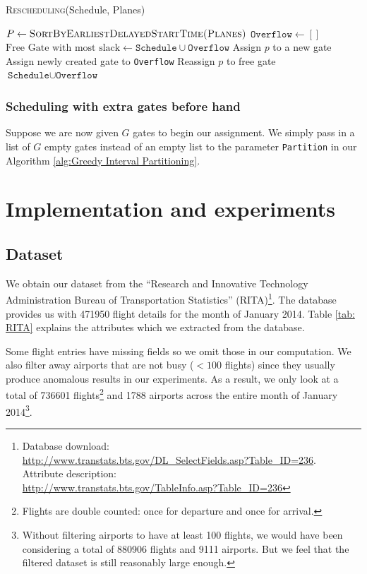\documentclass[12pt, a4paper]{report}
\begin{document}
\begin{algorithm}[h!]
\begin{algorithmic}[1]
\caption{\textsc{Rescheduling}(Schedule, Planes)}
\label{alg:Rescheduling}
\STATE $P \leftarrow \textsc{SortByEarliestDelayedStartTime(Planes)}$
\STATE $\texttt{Overflow} \leftarrow []$
		\STATE $\text{Free Gate with most slack} \leftarrow \texttt{Schedule} \cup \texttt{Overflow}$
			\STATE Assign $p$ to a new gate
			\STATE Assign newly created gate to \texttt{Overflow}
		\ELSE
			\STATE Reassign $p$ to free gate
		\ENDIF
	\ENDIF
\ENDFOR
\RETURN $\texttt{Schedule} \cup \texttt{Overflow}$
\end{algorithmic}
\end{algorithm}

\subsection{Scheduling with extra gates before hand}
Suppose we are now given $G$ gates to begin our assignment. We simply pass in a list of $G$ empty gates instead of an empty list to the parameter \texttt{Partition} in our Algorithm \ref{alg:Greedy Interval Partitioning}.

\chapter{Implementation and experiments}
\section{Dataset}
We obtain our dataset from the ``Research and Innovative Technology Administration Bureau of Transportation Statistics'' (RITA)\footnote{Database download:\\ \url{http://www.transtats.bts.gov/DL_SelectFields.asp?Table_ID=236}.\\ Attribute description:\\ \url{http://www.transtats.bts.gov/TableInfo.asp?Table_ID=236}}. The database provides us with 471950 flight details for the month of January 2014. Table \ref{tab: RITA} explains the attributes which we extracted from the database.

Some flight entries have missing fields so we omit those in our computation. We also filter away airports that are not busy ($<100$ flights) since they usually produce anomalous results in our experiments. As a result, we only look at a total of 736601 flights\footnote{Flights are double counted: once for departure and once for arrival.} and 1788 airports across the entire month of January 2014\footnote{Without filtering airports to have at least 100 flights, we would have been considering a total of 880906 flights and 9111 airports. But we feel that the filtered dataset is still reasonably large enough.}.
\end{document}
